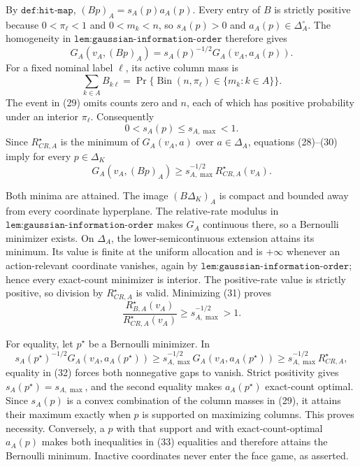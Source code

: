 By \(\texttt{def:hit-map}\), \((Bp)_A=s_A(p)a_A(p)\).  Every entry of \(B\) is strictly positive because \(0<\pi_\ell<1\) and \(0<m_k<n\), so \(s_A(p)>0\) and \(a_A(p)\in\Delta_A^\circ\).  The homogeneity in \(\texttt{lem:gaussian-information-order}\) therefore gives
\[
G_A(v_A,(Bp)_A)=s_A(p)^{-1/2}G_A(v_A,a_A(p)). \tag{28}
\]
For a fixed nominal label \(\ell\), its active column mass is
\[
\sum_{k\in A}B_{k\ell}
=\Pr\{\operatorname{Bin}(n,\pi_\ell)\in\{m_k:k\in A\}\}. \tag{29}
\]
The event in (29) omits counts zero and \(n\), each of which has positive probability under an interior \(\pi_\ell\).  Consequently
\[
0<s_A(p)\leq s_{A,\max}<1. \tag{30}
\]
Since \(R_{CR,A}^\star\) is the minimum of \(G_A(v_A,a)\) over \(a\in\Delta_A\), equations (28)--(30) imply for every \(p\in\Delta_K\)
\[
G_A(v_A,(Bp)_A)
\geq s_{A,\max}^{-1/2}R_{CR,A}^\star(v_A). \tag{31}
\]

Both minima are attained.  The image \((B\Delta_K)_A\) is compact and bounded away from every coordinate hyperplane.  The relative-rate modulus in \(\texttt{lem:gaussian-information-order}\) makes \(G_A\) continuous there, so a Bernoulli minimizer exists.  On \(\Delta_A\), the lower-semicontinuous extension attains its minimum.  Its value is finite at the uniform allocation and is \(+\infty\) whenever an action-relevant coordinate vanishes, again by \(\texttt{lem:gaussian-information-order}\); hence every exact-count minimizer is interior.  The positive-rate value is strictly positive, so division by \(R_{CR,A}^\star\) is valid.  Minimizing (31) proves
\[
\frac{R_{B,A}^\star(v_A)}{R_{CR,A}^\star(v_A)}
\geq s_{A,\max}^{-1/2}>1. \tag{32}
\]

For equality, let \(p^\star\) be a Bernoulli minimizer.  In
\[
s_A(p^\star)^{-1/2}G_A(v_A,a_A(p^\star))
\geq s_{A,\max}^{-1/2}G_A(v_A,a_A(p^\star))
\geq s_{A,\max}^{-1/2}R_{CR,A}^\star, \tag{33}
\]
equality in (32) forces both nonnegative gaps to vanish.  Strict positivity gives \(s_A(p^\star)=s_{A,\max}\), and the second equality makes \(a_A(p^\star)\) exact-count optimal.  Since \(s_A(p)\) is a convex combination of the column masses in (29), it attains their maximum exactly when \(p\) is supported on maximizing columns.  This proves necessity.  Conversely, a \(p\) with that support and with exact-count-optimal \(a_A(p)\) makes both inequalities in (33) equalities and therefore attains the Bernoulli minimum.  Inactive coordinates never enter the face game, as asserted.